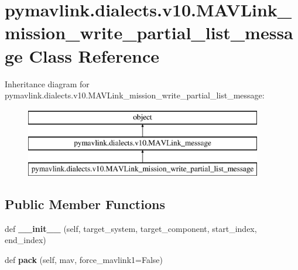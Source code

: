 \hypertarget{classpymavlink_1_1dialects_1_1v10_1_1MAVLink__mission__write__partial__list__message}{}\section{pymavlink.\+dialects.\+v10.\+M\+A\+V\+Link\+\_\+mission\+\_\+write\+\_\+partial\+\_\+list\+\_\+message Class Reference}
\label{classpymavlink_1_1dialects_1_1v10_1_1MAVLink__mission__write__partial__list__message}
Inheritance diagram for pymavlink.\+dialects.\+v10.\+M\+A\+V\+Link\+\_\+mission\+\_\+write\+\_\+partial\+\_\+list\+\_\+message\+:\begin{figure}[H]
\begin{center}
\leavevmode
\includegraphics[height=3.000000cm]{classpymavlink_1_1dialects_1_1v10_1_1MAVLink__mission__write__partial__list__message}
\end{center}
\end{figure}
\subsection*{Public Member Functions}
\begin{DoxyCompactItemize}
\item 
\mbox{\label{classpymavlink_1_1dialects_1_1v10_1_1MAVLink__mission__write__partial__list__message_ae0868ed70ec0bf5200c6427b7420b9ce}} 
def {\bfseries \+\_\+\+\_\+init\+\_\+\+\_\+} (self, target\+\_\+system, target\+\_\+component, start\+\_\+index, end\+\_\+index)
\item 
\mbox{\label{classpymavlink_1_1dialects_1_1v10_1_1MAVLink__mission__write__partial__list__message_a97a9f52b07b78ba61f9783f83d7011b4}} 
def {\bfseries pack} (self, mav, force\+\_\+mavlink1=False)
\end{DoxyCompactItemize}
